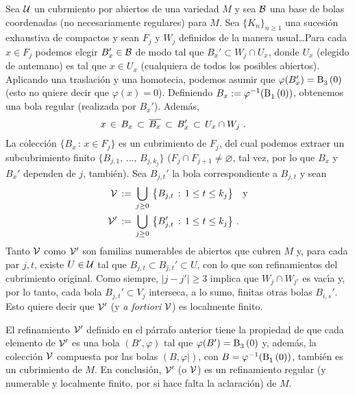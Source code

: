 Sea $\cal U$ un cubrmiento por abiertos de una variedad $M$ y sea $\cal B$ una
base de bolas coordenadas (no necesariamente regulares) para $M$. Sea
$\{K_n\}_{n\geq 1}$ una sucesi\'{o}n exhaustiva de compactos y sean $F_j$ y
$W_j$ definidos de la manera usual\dots Para cada $x\in F_j$ podemos elegir
$B_x'\in\cal B$ de modo tal que $B_x'\subset W_j\cap U_x$, donde $U_x$ (elegido
de antemano) es tal que $x\in U_x$ (cualquiera de todos los posibles abiertos).
Aplicando una traslaci\'{o}n y una homotecia, podemos asumir que
$\varphi(B_x')=\bola{3}{0}$ (esto no quiere decir que $\varphi(x)=0$).
Definiendo $B_x:=\varphi^{-1}(\bola{1}{0})$, obtenemos una bola regular
(realizada por $B_x'$). Adem\'{a}s,
\begin{align*}
	x & \,\in\,B_x\,\subset\,\clos{B_x}\,\subset\,B_x'\,\subset\,
		U_x\cap W_j
	\text{ .}
\end{align*}
%
La colecci\'{o}n $\{B_x\,:\,x\in F_j\}$ es un cubrimiento de $F_j$, del cual
podemos extraer un subcubrimiento finito $\{B_{j,1},\,\dots,\,B_{j,k_j}\}$
($F_j\cap F_{j+1}\not=\varnothing$, tal vez, por lo que $B_x$ y $B_x'$ dependen
de $j$, tambi\'{e}n). Sea $B_{j,t}'$ la bola correspondiente a $B_{j,t}$ y sean
\begin{align*}
	\cal V & \,:=\,\bigcup_{j\geq 0}\,\big\{B_{j,t}\,:\,
		1\leq t\leq k_j\big\} \quad\text{y} \\
	\cal V' & \,:=\,\bigcup_{j\geq 0}\,\big\{B_{j,t}'\,:\,
		1\leq t\leq k_j\big\}
	\text{ .}
\end{align*}
%
Tanto $\cal V$ como $\cal V'$ son familias numerables de abiertos que cubren
$M$ y, para cada par $j,t$, existe $U\in\cal U$ tal que
$B_{j,t}\subset B_{j,t}'\subset U$, con lo que son refinamientos del
cubrimiento original. Como siempre, $|j-j'|\geq 3$ implica que $W_j\cap W_{j'}$
es vac\'{\i}a y, por lo tanto, cada bola $B_{j,t}'\subset V_j$ interseca, a lo
sumo, finitas otras bolas $B_{i,s}'$. Esto quiere decir que $\cal V'$ (y
\emph{a fortiori} $\cal V$) es localmente finito.

El refinamiento $\cal V'$ definido en el p\'{a}rrafo anterior tiene la
propiedad de que cada elemento de $\cal V'$ es una bola $(B',\varphi)$ tal que
$\varphi(B')=\bola{3}{0}$ y, adem\'{a}s, la colecci\'{o}n $\cal V$
compuesta por las bolas $(B,\varphi|)$, con $B=\varphi^{-1}(\bola{1}{0})$,
tambi\'{e}n es un cubrimiento de $M$. En conclusi\'{o}n, $\cal V'$ (o $\cal V$)
es un refinamiento regular (y numerable y localmente finito, por si hace falta
la aclaraci\'{o}n) de $M$.

